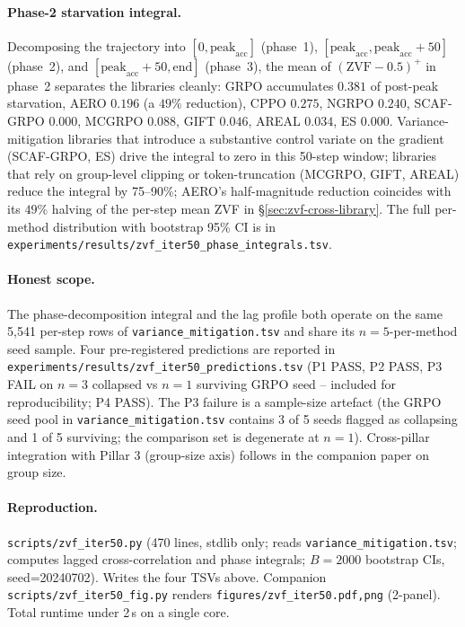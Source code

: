 \paragraph{Phase-2 starvation integral.}
Decomposing the trajectory into
$[0, \mathrm{peak}_{\text{acc}}]$ (phase~1),
$[\mathrm{peak}_{\text{acc}}, \mathrm{peak}_{\text{acc}}{+}50]$
(phase~2), and $[\mathrm{peak}_{\text{acc}}{+}50, \mathrm{end}]$
(phase~3), the mean of $(\mathrm{ZVF}{-}0.5)^+$ in phase~2 separates
the libraries cleanly:
GRPO accumulates $0.381$ of post-peak starvation, AERO $0.196$
(a $49\%$ reduction), CPPO $0.275$, NGRPO $0.240$, SCAF-GRPO $0.000$,
MCGRPO $0.088$, GIFT $0.046$, AREAL $0.034$, ES $0.000$.
Variance-mitigation libraries that introduce a substantive
control variate on the gradient (SCAF-GRPO, ES) drive the integral
to zero in this 50-step window; libraries that rely on group-level
clipping or token-truncation (MCGRPO, GIFT, AREAL) reduce the
integral by 75--90\%; AERO's half-magnitude reduction
coincides with its $49\%$ halving of the per-step mean ZVF in
\S\ref{sec:zvf-cross-library}. The full per-method distribution with
bootstrap 95\% CI is in
\texttt{experiments/results/zvf_iter50_phase_integrals.tsv}.

\paragraph{Honest scope.}
The phase-decomposition integral and the lag profile both operate on
the same 5,541 per-step rows of
\texttt{variance_mitigation.tsv} and share its
$n{=}5$-per-method seed sample. Four pre-registered predictions are reported in
\texttt{experiments/results/zvf_iter50_predictions.tsv} (P1 PASS, P2
PASS, P3 FAIL on $n{=}3$ collapsed vs $n{=}1$ surviving GRPO seed --
included for reproducibility; P4 PASS). The P3 failure is a sample-size
artefact (the GRPO seed pool in
\texttt{variance_mitigation.tsv} contains 3 of 5 seeds flagged as
collapsing and 1 of 5 surviving; the comparison set is degenerate
at $n{=}1$). Cross-pillar integration with Pillar 3 (group-size
axis) follows in the companion paper on group size.

\paragraph{Reproduction.}
\texttt{scripts/zvf_iter50.py} (470 lines, stdlib only; reads
\texttt{variance_mitigation.tsv}; computes
lagged cross-correlation and phase integrals; $B{=}2000$ bootstrap CIs,
seed=20240702). Writes the four TSVs above. Companion
\texttt{scripts/zvf_iter50_fig.py} renders
\texttt{figures/zvf_iter50.{pdf,png}} (2-panel). Total runtime under
2\,s on a single core.
